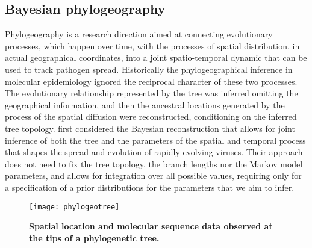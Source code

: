 
\subsection{Bayesian phylogeography}

Phylogeography is a research direction aimed at connecting evolutionary processes, which happen over time, with the processes of spatial distribution, in actual geographical coordinates, into a joint spatio-temporal dynamic that can be used to track pathogen spread.
Historically the phylogeographical inference in molecular epidemiology ignored the reciprocal character of these two processes. 
The evolutionary relationship represented by the tree was inferred omitting the geographical information, and then the ancestral locations generated by the process of the spatial diffusion were reconstructed, conditioning on the inferred tree topology.
\citet{Lemey2009} first considered the Bayesian reconstruction that allows for joint inference of both the tree and the parameters of the spatial and temporal process that shapes the spread and evolution of 
rapidly evolving viruses.
Their approach does not need to fix the tree topology, the branch lengths nor the Markov model parameters, and allows for integration over all possible values, requiring only for a specification of a prior distributions for the parameters that we aim to infer.

\begin{figure}[H]
\centering
\texttt{[image: phylogeotree]} 
\caption{
{ \footnotesize 
{\bf Spatial location and molecular sequence data observed at the tips of a phylogenetic tree.} 
}%
}
\label{fig:phylogeotree}
\end{figure}

